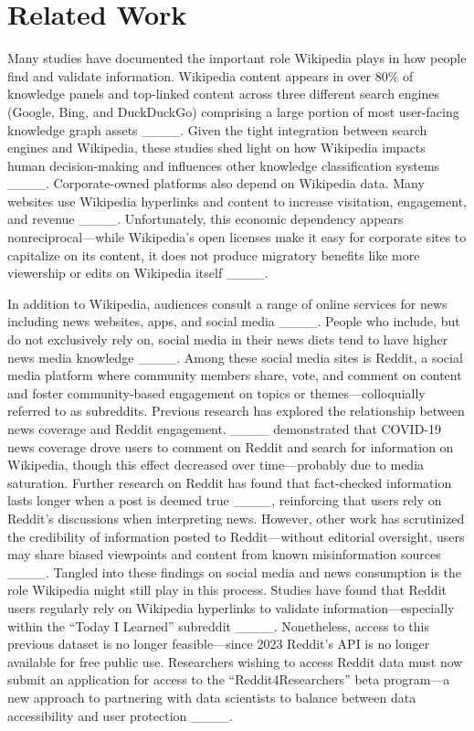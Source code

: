 \section{Related Work}
Many studies have documented the important role Wikipedia plays in how people find and validate information. Wikipedia content appears in over 80\% of knowledge panels and top-linked content across three different search engines (Google, Bing, and DuckDuckGo) comprising a large portion of most user-facing knowledge graph assets ____. Given the tight integration between search engines and Wikipedia, these studies shed light on how Wikipedia impacts human decision-making and influences other knowledge classification systems ____. Corporate-owned platforms also depend on Wikipedia data. Many websites use Wikipedia hyperlinks and content to increase visitation, engagement, and revenue ____.  Unfortunately, this economic dependency appears nonreciprocal---while Wikipedia’s open licenses make it easy for corporate sites to capitalize on its content, it does not produce migratory benefits like more viewership or edits on Wikipedia itself ____. 

In addition to Wikipedia, audiences consult a range of online services for news including news websites, apps, and social media ____. People who include, but do not exclusively rely on, social media in their news diets tend to have higher news media knowledge ____. Among these social media sites is Reddit, a social media platform where community members share, vote, and comment on content and foster community-based engagement on topics or themes---colloquially referred to as subreddits. Previous research has explored the relationship between news coverage and Reddit engagement. ____ demonstrated that COVID-19 news coverage drove users to comment on Reddit and search for information on Wikipedia, though this effect decreased over time---probably due to media saturation. Further research on Reddit has found that fact-checked information lasts longer when a post is deemed true ____, reinforcing that users rely on Reddit's discussions when interpreting news. However, other work has scrutinized the credibility of information posted to Reddit---without editorial oversight, users may share biased viewpoints and content from known misinformation sources ____. Tangled into these findings on social media and news consumption is the role Wikipedia might still play in this process. Studies have found that Reddit users regularly rely on Wikipedia hyperlinks to validate information---especially within the ``Today I Learned'' subreddit ____. Nonetheless, access to this previous dataset is no longer feasible---since 2023 Reddit’s API is no longer available for free public use. Researchers wishing to access Reddit data must now submit an application for access to the ``Reddit4Researchers'' beta program---a new approach to partnering with data scientists to balance between data accessibility and user protection ____.


